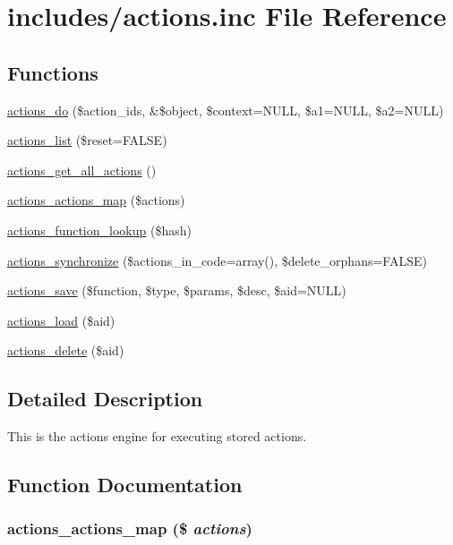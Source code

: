 \hypertarget{actions_8inc}{
\section{includes/actions.inc File Reference}
\label{actions_8inc}
}
\subsection*{Functions}
\begin{CompactItemize}
\item 
\hyperlink{actions_8inc_7da5f346de3d54e5b0cee717a6f2d390}{actions\_\-do} (\$action\_\-ids, \&\$object, \$context=NULL, \$a1=NULL, \$a2=NULL)
\item 
\hyperlink{actions_8inc_d0dbf276d4ca1834760cffc7e1b1be53}{actions\_\-list} (\$reset=FALSE)
\item 
\hyperlink{actions_8inc_4275e9fee609ba6e85b03278a681436c}{actions\_\-get\_\-all\_\-actions} ()
\item 
\hyperlink{actions_8inc_d943b3f497c80809d895ecc01490d10f}{actions\_\-actions\_\-map} (\$actions)
\item 
\hyperlink{actions_8inc_4a0e35c01b48d1a413889948c061a6f0}{actions\_\-function\_\-lookup} (\$hash)
\item 
\hyperlink{actions_8inc_a4445cbadb5d03206c4a724581b2b30c}{actions\_\-synchronize} (\$actions\_\-in\_\-code=array(), \$delete\_\-orphans=FALSE)
\item 
\hyperlink{actions_8inc_58e2d372003a208c732f98cfb00b1c98}{actions\_\-save} (\$function, \$type, \$params, \$desc, \$aid=NULL)
\item 
\hyperlink{actions_8inc_1e953639945d342b20fe51b8d21095cc}{actions\_\-load} (\$aid)
\item 
\hyperlink{actions_8inc_857468911c3dd6f839cbdb14c6ed80ac}{actions\_\-delete} (\$aid)
\end{CompactItemize}


\subsection{Detailed Description}
This is the actions engine for executing stored actions. 

\subsection{Function Documentation}
\hypertarget{actions_8inc_d943b3f497c80809d895ecc01490d10f}{
\subsubsection[{actions\_\-actions\_\-map}]{\setlength{\rightskip}{0pt plus 5cm}actions\_\-actions\_\-map (\$ {\em actions})}}
\label{actions_8inc_d943b3f497c80809d895ecc01490d10f}


